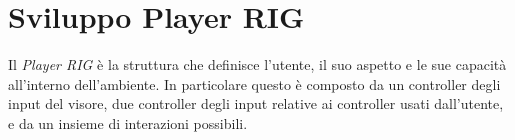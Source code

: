 \section{Sviluppo Player RIG}
\label{sec:player-rig}

Il \textit{Player RIG} è la struttura che definisce l'utente, il suo aspetto e le
sue capacità all'interno dell'ambiente. In particolare questo è composto da un
controller degli input del visore, due controller degli input relative ai controller %
usati dall'utente, e da un insieme di interazioni possibili.